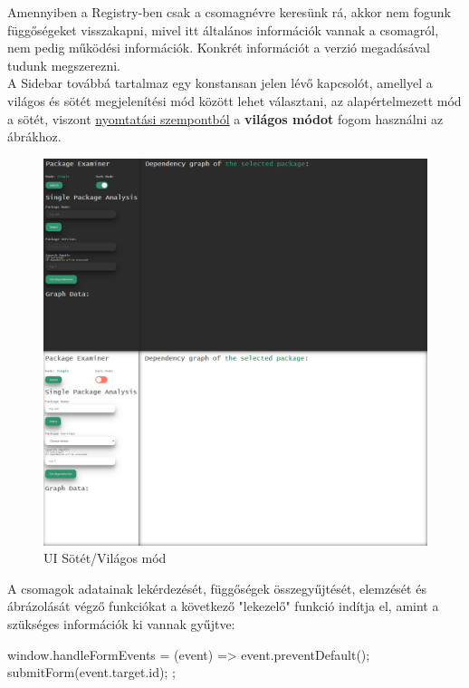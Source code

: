 Amennyiben a Registry-ben csak a csomagnévre keresünk rá, akkor nem fogunk függőségeket visszakapni, mivel itt általános információk vannak a csomagról, nem pedig működési információk. Konkrét információt a verzió megadásával tudunk megszerezni.\\

A Sidebar továbbá tartalmaz egy konstansan jelen lévő kapcsolót, amellyel a világos és sötét megjelenítési mód között lehet választani, az alapértelmezett mód a sötét, viszont \underline{nyomtatási szempontból} a \textbf{világos módot} fogom használni az ábrákhoz. 

\begin{figure}[!h]
	\centering
	\includegraphics[scale=0.15]{images/ui_darkmode.png}
	\caption{UI Sötét/Világos mód}
	\label{fig:ui_darkmode}
\end{figure}

A csomagok adatainak lekérdezését, függőségek összegyűjtését, elemzését és ábrázolását végző funkciókat a következő "lekezelő" funkció indítja el, amint a szükséges információk ki vannak gyűjtve:

\begin{cpp}
window.handleFormEvents = (event) => {
	event.preventDefault();
	submitForm(event.target.id);
};
\end{cpp}

